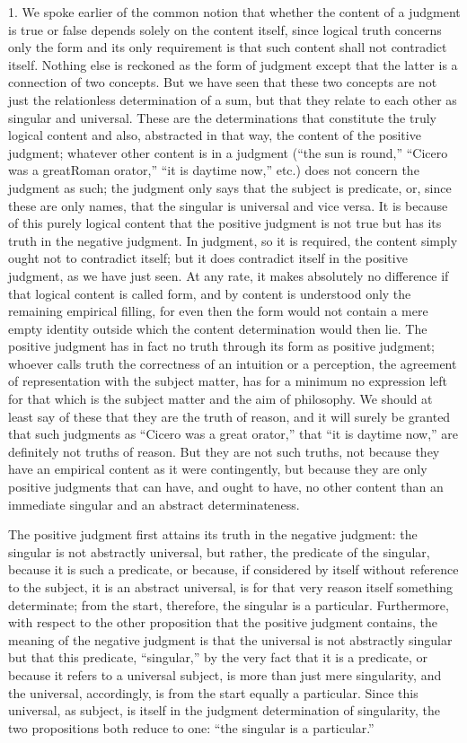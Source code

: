 1. We spoke earlier of the common notion
that whether the content of a judgment is true or false
depends solely on the content itself,
since logical truth concerns only the form
and its only requirement is that such
content shall not contradict itself.
Nothing else is reckoned as the form of judgment except
that the latter is a connection of two concepts.
But we have seen that these two concepts are not
just the relationless determination of a sum,
but that they relate to each other as singular and universal.
These are the determinations that
constitute the truly logical content
and also, abstracted in that way,
the content of the positive judgment;
whatever other content is in a judgment
(“the sun is round,” “Cicero was a greatRoman orator,”
 “it is daytime now,” etc.)
does not concern the judgment as such;
the judgment only says that the subject is predicate,
or, since these are only names,
that the singular is universal and vice versa.
It is because of this purely logical content
that the positive judgment is not true
but has its truth in the negative judgment.
In judgment, so it is required,
the content simply ought not to contradict itself;
but it does contradict itself in the positive judgment,
as we have just seen.
At any rate, it makes absolutely no difference
if that logical content is called form,
and by content is understood only the remaining empirical filling,
for even then the form would not contain a mere empty identity outside
which the content determination would then lie.
The positive judgment has in fact
no truth through its form as positive judgment;
whoever calls truth the correctness of an intuition or a perception,
the agreement of representation with the subject matter,
has for a minimum no expression left for that
which is the subject matter and the aim of philosophy.
We should at least say of these that they are the truth of reason,
and it will surely be granted that such judgments
as “Cicero was a great orator,”
that “it is daytime now,”
are definitely not truths of reason.
But they are not such truths,
not because they have an empirical content as it were contingently,
but because they are only positive judgments that can have,
and ought to have, no other content  than an immediate singular
and an abstract determinateness.

The positive judgment first attains its truth in the negative judgment:
the singular is not abstractly universal,
but rather, the predicate of the singular,
because it is such a predicate,
or because, if considered by itself
without reference to the subject,
it is an abstract universal,
is for that very reason itself something determinate;
from the start, therefore, the singular is a particular.
Furthermore, with respect to the other proposition
that the positive judgment contains,
the meaning of the negative judgment is
that the universal is not abstractly singular
but that this predicate, “singular,”
by the very fact that it is a predicate,
or because it refers to a universal subject,
is more than just mere singularity,
and the universal, accordingly,
is from the start equally a particular.
Since this universal, as subject,
is itself in the judgment determination of singularity,
the two propositions both reduce to one:
“the singular is a particular.”

